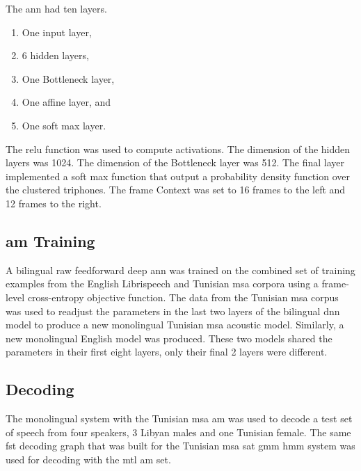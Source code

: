The \gls{ann} had ten layers.

\begin{enumerate}
\item One input layer,
\item 6 hidden layers,
\item One Bottleneck layer,
\item One affine layer, and
\item One soft max layer.
\end{enumerate}


The \gls{relu} function was used to compute activations.
The dimension of the hidden layers was 1024.
The dimension of the Bottleneck layer was 512.
The final layer implemented  a soft max function that output a probability density function over the clustered triphones.
The frame Context was set to 16 frames to the left and 12 frames to the right.

\subsection{\gls{am} Training}
\label{sec:train}


A bilingual raw feedforward deep \gls{ann}  was trained on the combined set of training examples from the English Librispeech and Tunisian \gls{msa}  corpora using a frame-level cross-entropy objective function.
The data from the Tunisian \gls{msa} corpus was used to readjust the parameters in the last two layers of the bilingual \gls{dnn} model to produce a new monolingual Tunisian \gls{msa}  acoustic model. 
Similarly, a new monolingual English model was produced.
These two models shared the parameters in their first eight layers, only their final 2 layers were different.

\subsection{Decoding}
\label{sec:decode}


The monolingual system with the Tunisian \gls{msa} \gls{am} was used to decode a test set of speech from four speakers, 3 Libyan males and one Tunisian female.
The same \gls{fst} decoding graph that was built for the Tunisian \gls{msa} \gls{sat} \gls{gmm} \gls{hmm} system was used for decoding with the \gls{mtl} \gls{am} set.
